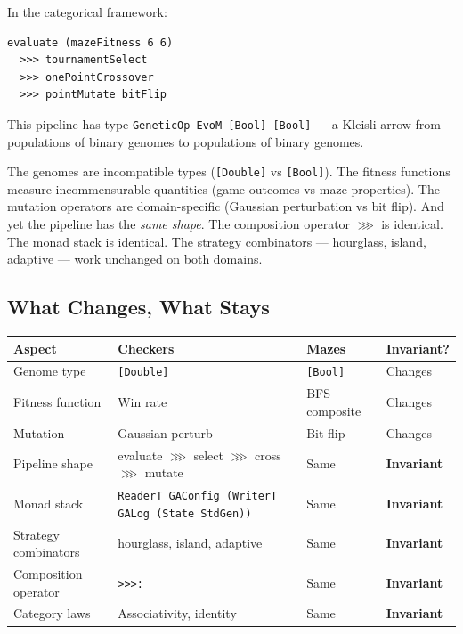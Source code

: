\documentclass[10pt]{article}
\begin{document}
In the categorical framework:

\begin{lstlisting}[style=plainstyle]
evaluate (mazeFitness 6 6)
  >>> tournamentSelect
  >>> onePointCrossover
  >>> pointMutate bitFlip
\end{lstlisting}

This pipeline has type \texttt{GeneticOp EvoM [Bool] [Bool]} --- a Kleisli arrow from populations of binary genomes to populations of binary genomes.

The genomes are incompatible types (\texttt{[Double]} vs \texttt{[Bool]}). The fitness functions measure incommensurable quantities (game outcomes vs maze properties). The mutation operators are domain-specific (Gaussian perturbation vs bit flip). And yet the pipeline has the \emph{same shape}. The composition operator $\ggg$ is identical. The monad stack is identical. The strategy combinators --- hourglass, island, adaptive --- work unchanged on both domains.


\subsection{What Changes, What Stays}

\begin{table}[ht]
\centering
\small
\begin{tabular}{@{}llll@{}}
\toprule
\textbf{Aspect} & \textbf{Checkers} & \textbf{Mazes} & \textbf{Invariant?} \\
\midrule
Genome type         & \texttt{[Double]}         & \texttt{[Bool]}          & Changes \\
Fitness function    & Win rate                  & BFS composite            & Changes \\
Mutation            & Gaussian perturb          & Bit flip                 & Changes \\
Pipeline shape      & evaluate $\ggg$ select $\ggg$ cross $\ggg$ mutate & Same & \textbf{Invariant} \\
Monad stack         & \texttt{ReaderT GAConfig (WriterT GALog (State StdGen))} & Same & \textbf{Invariant} \\
Strategy combinators & hourglass, island, adaptive & Same & \textbf{Invariant} \\
Composition operator & \texttt{>{>}{>}:}         & Same                     & \textbf{Invariant} \\
Category laws       & Associativity, identity   & Same                     & \textbf{Invariant} \\
\bottomrule
\end{tabular}
\end{table}
\end{document}

